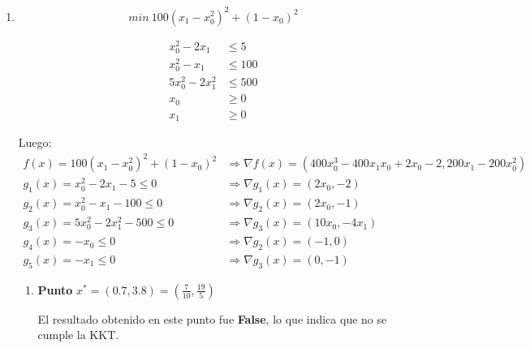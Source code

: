 \documentclass[titlepage, 11pt]{scrartcl}
\begin{document}
\begin{enumerate}
\begin{enumerate}
\begin{enumerate}
			En este caso $I(x^*)  = \emptyset$, por tanto se cumple la condici\'on de regularidad de $x^*$, o sea, que cumple con la LICQ.
			
			El hecho de que no se cumpla la condición de KKT permite afirmar que o bien el punto no es un m\'inimo local del problema o que no se cumple la LICQ (que no se cumplan ninguna de las dos también podría es una opci\'on); en este caso, s\'i se cumple la condici\'on de regularidad, por tanto el punto $x^*$ no es un m\'inimo local del problema.
		\end{enumerate}
	
	\vspace{1cm}
		\item \begin{equation*}
		min \ 100(x_1 - x_0^2)^2 + (1 - x_0)^2
		\end{equation*}
		
		\begin{align*}
		x_0^2 - 2x_1 &\leq 5\\
		x_0^2 - x_1 &\leq 100\\
		5x_0^2 - 2 x_1^2 &\leq 500\\
		x_0 &\geq 0\\
		x_1 &\geq 0
		\end{align*}
		
		Luego:
		\begin{align*}
		f(x) = 100(x_1 - x_0^2)^2 + (1 - x_0)^2 &\Rightarrow \nabla f(x) = (400 x_0^3 - 400 x_1x_0 + 2x_0 - 2, 200x_1 - 200x_0^2)\\
		g_1(x) = x_0^2 - 2x_1 - 5 \leq 0 &\Rightarrow \nabla g_1(x) = (2 x_0, -2)\\
		g_2(x) = x_0^2 - x_1 - 100 \leq 0 &\Rightarrow \nabla g_2(x) = (2x_0, -1)\\
		g_3(x) = 5x_0^2 - 2 x_1^2 - 500 \leq 0 &\Rightarrow \nabla g_3(x) = (10x_0, -4x_1) \\
		g_4(x) = -x_0 \leq 0 &\Rightarrow \nabla g_2(x) = (-1, 0)\\
		g_5(x) =  -x_1 \leq 0 &\Rightarrow \nabla g_3(x) = (0, -1)
		\end{align*}
			
			
		\vspace{7mm}
		\begin{enumerate}
			\item \textbf{Punto} $x^* = (0.7, 3.8) = (\frac{7}{10}, \frac{19}{5})$
			
			El resultado obtenido en este punto fue \textbf{False}, lo que indica que no se cumple la KKT.
			

\end{enumerate}
\end{enumerate}
\end{enumerate}
\end{document}
